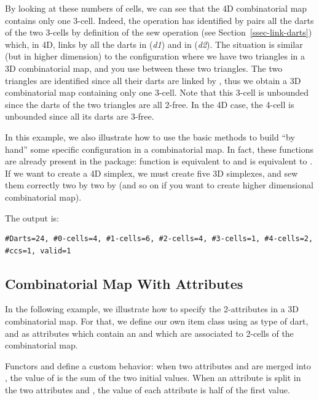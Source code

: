 By looking at these numbers of cells, we can see that the 4D
combinatorial map contains only one 3-cell. Indeed, the 
operation has identified by pairs all the darts of the two 3-cells
by definition of the sew operation (see Section~\ref{ssec-link-darts})
which, in 4D, links by \betatrois{} all the darts in
\orbit{\betaun{},\betadeux{}}(\emph{d1}) and in \orbit{\betaun{},\betadeux{}}(\emph{d2}).  The
situation is similar (but in higher dimension) to the
configuration where we have two triangles in a 3D combinatorial map,
and you use  between these two triangles. The two triangles
are identified since all their darts are linked by \betatrois{}, thus we
obtain a 3D combinatorial map containing only one 3-cell. Note that
this 3-cell is unbounded since the darts of the two triangles are all
2-free. In the 4D case, the 4-cell is unbounded since all its darts
are 3-free.

In this example, we also illustrate how to use the basic methods to
build ``by hand'' some specific configuration in a combinatorial
map. In fact, these functions are already present in the package:
function  is equivalent to
 and
 is equivalent to
.  If we want to create a 4D
simplex, we must create five 3D simplexes, and sew them correctly
two by two by \betatrois{} (and so on if you want to create higher
dimensional combinatorial map).


The output is:
\begin{verbatim}
#Darts=24, #0-cells=4, #1-cells=6, #2-cells=4, #3-cells=1, #4-cells=2, #ccs=1, valid=1
\end{verbatim}

\subsection{Combinatorial Map With Attributes}
\label{ssec-combi-map-with-color}
In the following example, we illustrate how to specify the
2-attributes in a 3D combinatorial map. For that, we define our own
item class using  as type of dart, and
as attributes which contain an  and which are associated to
2-cells of the combinatorial map.

Functors  and  define a
custom behavior: when two attributes  and  are
merged into , the value of  is the sum of the
two initial values.  When an attribute  is split in the two
attributes  and , the value of each attribute is
half of the first value.

